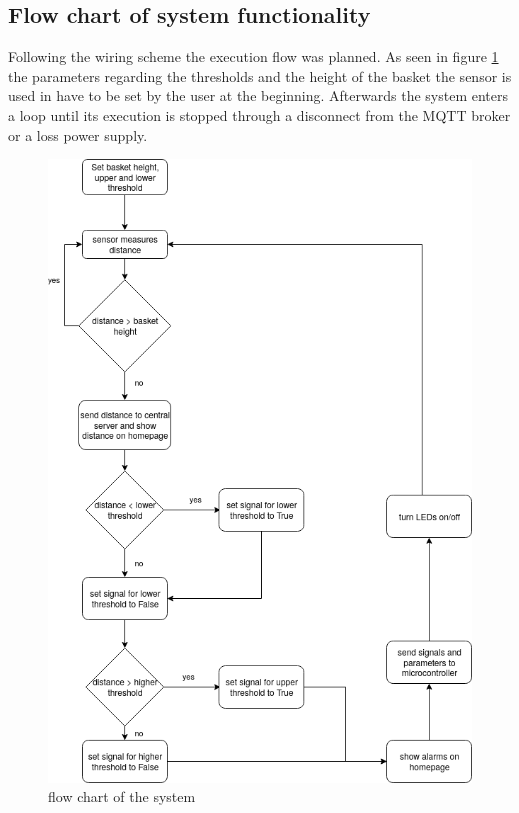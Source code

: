 \documentclass{article}
\begin{document}
\subsection{Flow chart of system functionality}
Following the wiring scheme the execution flow was planned. As seen in figure \ref{flowChart} the parameters regarding the thresholds and the height of the basket the sensor is used in have to be set by the user at the beginning. Afterwards the system enters a loop  until its execution is stopped through a disconnect from the MQTT broker or a loss power supply.
\begin{figure}[h]
		\center \includegraphics[scale=0.6]{flowChart.png}
		\caption{flow chart of the system}
		\label{flowChart}
\end{figure}
\end{document}
